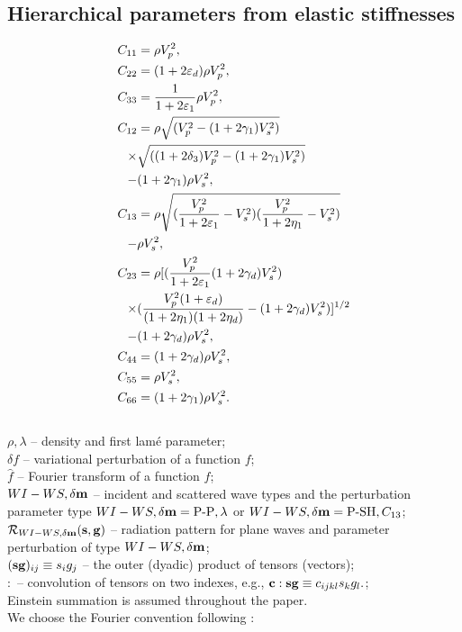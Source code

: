 \subsection*{Hierarchical parameters from elastic stiffnesses}
\begin{align} \label{eq:jw}
C_{11} &=\rho V^2_{p},
\\
C_{22} &=(1+2\varepsilon_d)\rho V^2_{p},
\\
C_{33} &= \frac{1}{1+2\varepsilon_1} \rho V^2_{p},
\\
C_{12} &= \rho \sqrt{( V^2_{p}-(1+2\gamma_1) V^2_{s})}\\
\times&\sqrt{((1+2\delta_3)V^2_{p}-(1+2\gamma_1) V^2_{s})}\\
- & (1+2\gamma_1 )\rho V^2_{s},
\\
C_{13} &= \rho \sqrt{(\frac{V^2_{p}}{1+2\varepsilon_1}-V^2_{s})
	(\frac{V^2_{p}}{1+2\eta_1}-V^2_{s})}
\\
-&\rho V^2_{s},
\\
C_{23} &= \rho [(\frac{V^2_{p}}{1+2\varepsilon_1}(1+2\gamma_d)V_s^2)
\\
\times & (\frac{V^2_{p}(1+\varepsilon_d)}{(1+2\eta_1)(1+2\eta_d)}-(1+2\gamma_d)V^2_{s})]^{1/2} 
\\
-&(1+2\gamma_d)\rho V^2_{s},
\\
C_{44} &=(1+2\gamma_d)\rho V^2_{s},
\\
C_{55} &=\rho V^2_{s},
\\
C_{66} &=(1+2\gamma_1)\rho V^2_{s}.
\end{align}
\\
$\rho, \lambda$ -- density and first lamé parameter;
\\
$\delta f$ -- variational perturbation of a function $f$;
\\
$\hat{f}$ -- Fourier transform of a function $f$;
\\
${WI-WS, \delta \mathbf{m}}$ -- incident and scattered wave types and the perturbation parameter type  ${WI-WS, \delta \mathbf{m}} = \text{P-P}, \lambda$ or ${WI-WS, \delta \mathbf{m}} = \text{P-SH}, C_{13}$;
\\
$\mathcal{R}_{WI-WS, \delta \mathbf{m}}(\mathbf{s},\mathbf{g})$ -- radiation pattern for plane waves and parameter perturbation of type ${WI-WS, \delta \mathbf{m}}$;
\\
$(\mathbf{s}  \mathbf{g})_{ij} \equiv s_i g_j$ -- the outer (dyadic) product of tensors (vectors); 
\\
$:$ -- convolution of tensors on two indexes, e.g.,
$\mathbf{c}:\mathbf{s}\mathbf{g} \equiv c_{ijkl}s_kg_l.$;
\\
Einstein summation is assumed throughout the paper.
\\
We choose the Fourier convention following \cite{hudson1981}:
